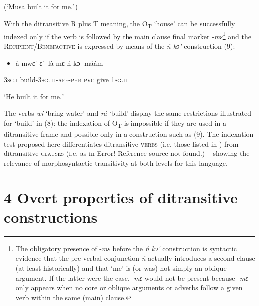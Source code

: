 \documentclass[output=paper]{langsci/langscibook}
\begin{document}
\begin{styleTranslation}
(‘Musa built it for me.ʼ)
\end{styleTranslation}

With the ditransitive R plus T meaning, the O\textsubscript{T} ‘house’ can be successfully indexed only if the verb is followed by the main clause final marker -\textit{mɛ}\footnote{ The obligatory presence of -\textit{mɛ} before the \textit{\'{n} kɔ\'{ }} construction is syntactic evidence that the pre-verbal conjunction \textit{\'{n} }actually introduces a second clause (at least historically) and that ‘me’ is (or was) not simply an oblique argument. If the latter were the case, -\textit{mɛ} would not be present because -\textit{mɛ} only appears when no core or oblique arguments or adverbs follow a given verb within the same (main) clause.}{ }and the \textsc{Recipient/Benefactive} is expressed by means of the \textit{\'{n} kɔ\'{ }} construction (9):

\begin{itemize}
\item \begin{styleNumberedEX}
\label{bkm:Ref446636254}\`{a}    mwɛ\'{ }-ɛ\`{ }-l\`{a}-mɛ      \'{n}  kɔ\'{ }  m\'{a}\'{a}m
\end{styleNumberedEX}\end{itemize}
\begin{styleGloss}
\textsc{3sg.i  }  build-\textsc{3sg.iii-aff-phb}  \textsc{pvc}  give\textsc{  1sg.ii}
\end{styleGloss}

\begin{styleTranslation}
‘He built it for me.ʼ
\end{styleTranslation}

The verbs \textit{w\'{i}} ‘bring water’ and \textit{r\'{a}} ‘build’ display the same restrictions illustrated for ‘build’ in (8): the indexation of O\textsubscript{T} is impossible if they are used in a ditransitive frame and possible only in a construction such as (9). The indexation test proposed here differentiates ditransitive \textsc{verbs} (i.e. those listed in ) from ditransitive \textsc{clauses} (i.e. as in Error! Reference source not found.) – showing the relevance of morphosyntactic transitivity at both levels for this language.

\chapter{4 Overt properties of ditransitive constructions }
\end{document}
